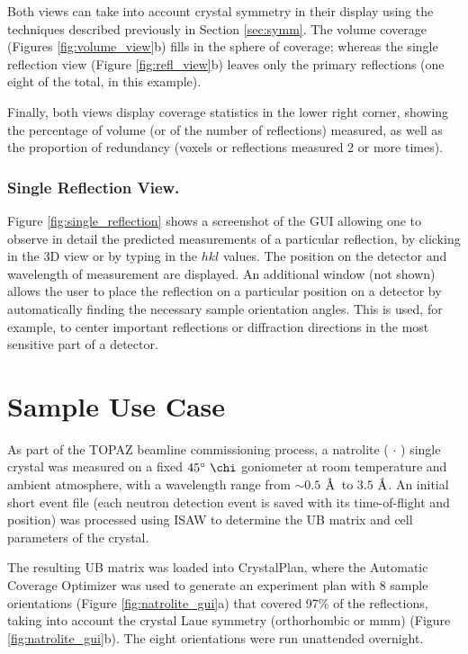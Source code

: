 \documentclass[final]{iucr}              %
\newcommand{\ang}{$\mathrm{\AA} $}
\begin{document}
Both views can take into account crystal symmetry in their display using the
techniques described previously in Section \ref{sec:symm}.
The volume coverage (Figures \ref{fig:volume_view}b) fills in the sphere of
coverage; 
whereas the single reflection view (Figure \ref{fig:refl_view}b) leaves only
the primary reflections (one eight of the total, in this example).
 
Finally, both views display coverage statistics in the lower right
corner, showing the percentage of volume (or of the number of reflections) measured,
as well as the proportion of redundancy (voxels or reflections measured 2 or more
times). 

\subsubsection{Single Reflection View.}
Figure \ref{fig:single_reflection} shows a screenshot of the GUI allowing one to
observe in detail the predicted measurements of a particular reflection, by clicking
in the 3D view or by typing in the $hkl$ values. The position on the detector
and wavelength of measurement are displayed. An additional window (not shown) allows the user to place the reflection on a particular
position on a detector by automatically finding the necessary sample orientation
angles. This is used, for example, to center important reflections or diffraction
directions in the most sensitive part of a detector.



\section{Sample Use Case}

As part of the TOPAZ beamline commissioning process, a natrolite
( $\cdot$ ) single crystal was measured on a fixed
$45\degree\ \chi$ goniometer at room temperature and ambient atmosphere, with a
wavelength range from $\sim0.5$ \ang\ to $3.5$ \ang.
An initial short event file (each neutron detection event is saved with its
time-of-flight and position) was processed using ISAW to determine the UB
matrix and cell parameters of the crystal.

The resulting UB matrix was loaded into CrystalPlan, where the Automatic
Coverage Optimizer was used to generate an experiment plan with 8 sample
orientations (Figure \ref{fig:natrolite_gui}a) that covered 97\% of the reflections,
taking into account the crystal Laue symmetry (orthorhombic or mmm) (Figure
\ref{fig:natrolite_gui}b). The eight orientations were run
unattended overnight.
\end{document}
